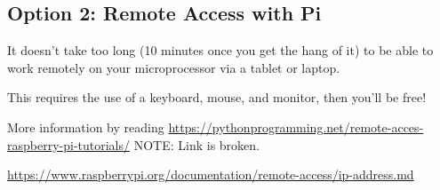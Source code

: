 \documentclass{article}\usepackage[]{graphicx}\usepackage[]{color}
\begin{document}
\subsection{Option 2: Remote Access with Pi}

It doesn't take too long (10 minutes once you get the hang of it) to be able to work remotely on your microprocessor via a tablet or laptop.  

This requires the use of a keyboard, mouse, and monitor, then you'll be free!

More information by reading \href{Remote Access with Raspberry Pi Tutorial}{https://pythonprogramming.net/remote-acces-raspberry-pi-tutorials/} NOTE: Link is broken.

\href{or this}{https://www.raspberrypi.org/documentation/remote-access/ip-address.md}
\end{document}
